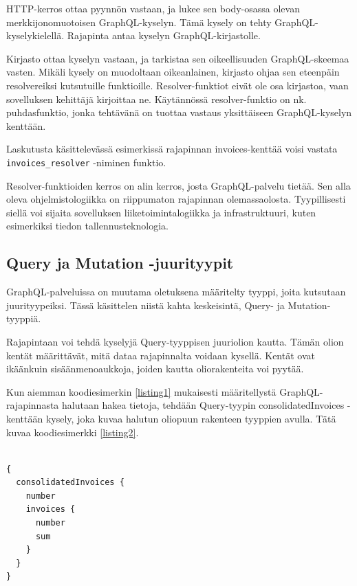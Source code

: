 HTTP-kerros ottaa pyynnön vastaan, ja lukee sen body-osassa olevan
merkkijonomuotoisen GraphQL-kyselyn. Tämä kysely on tehty
GraphQL-kyselykielellä. Rajapinta antaa kyselyn GraphQL-kirjastolle.

Kirjasto ottaa kyselyn vastaan, ja tarkistaa sen oikeellisuuden
GraphQL-skeemaa vasten. Mikäli kysely on muodoltaan oikeanlainen,
kirjasto ohjaa sen eteenpäin resolvereiksi kutsutuille funktioille.
Resolver-funktiot eivät ole osa kirjastoa, vaan sovelluksen kehittäjä
kirjoittaa ne. Käytännössä resolver-funktio on nk. \gls{puhdasfunktio},
jonka tehtävänä on tuottaa vastaus yksittäiseen GraphQL-kyselyn
kenttään.

Laskutusta käsittelevässä esimerkissä rajapinnan invoices-kenttää voisi
vastata \texttt{invoices\_resolver} -niminen funktio.

Resolver-funktioiden kerros on alin kerros, josta GraphQL-palvelu
tietää. Sen alla oleva ohjelmistologiikka on riippumaton rajapinnan
olemassaolosta. Tyypillisesti siellä voi sijaita sovelluksen
liiketoimintalogiikka ja infrastruktuuri, kuten esimerkiksi tiedon
tallennusteknologia.

\hypertarget{query-ja-mutation--juurityypit}{%
\subsection{Query ja Mutation
-juurityypit}\label{query-ja-mutation--juurityypit}}

GraphQL-palveluissa on muutama oletuksena määritelty tyyppi, joita
kutsutaan juurityypeiksi. Tässä käsittelen niistä kahta keskeisintä,
Query- ja Mutation-tyyppiä.

Rajapintaan voi tehdä kyselyjä Query-tyyppisen juuriolion kautta. Tämän
olion kentät määrittävät, mitä dataa rajapinnalta voidaan kysellä.
Kentät ovat ikäänkuin sisäänmenoaukkoja, joiden kautta oliorakenteita
voi pyytää.

Kun aiemman koodiesimerkin \ref{listing1} mukaisesti määritellystä
GraphQL-rajapinnasta halutaan hakea tietoja, tehdään Query-tyypin
consolidatedInvoices -kenttään kysely, joka kuvaa halutun oliopuun
rakenteen tyyppien avulla. Tätä kuvaa koodiesimerkki \ref{listing2}.

\begin{code}
  \begin{verbatim}

{
  consolidatedInvoices {
    number
    invoices {
      number
      sum
    }
  }
}
\end{verbatim}
  \label{listing2}
\end{code}

